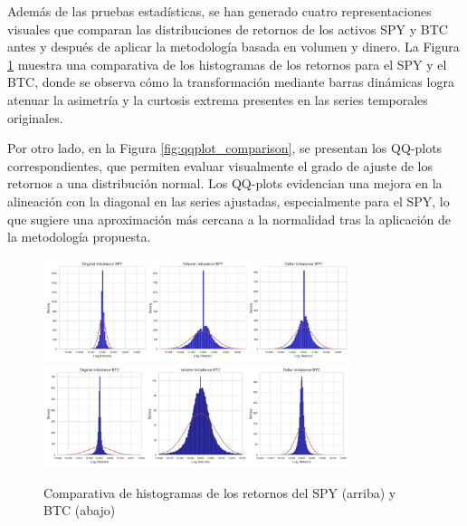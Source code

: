 \documentclass[a4paper,12pt, twoside]{report}
\begin{document}
Además de las pruebas estadísticas, se han generado cuatro representaciones visuales que comparan 
las distribuciones de retornos de los activos SPY y BTC antes y después de aplicar la metodología 
basada en volumen y dinero. La Figura \ref{fig:histogram_comparison} muestra una comparativa de 
los histogramas de los retornos para el SPY y el BTC, donde se observa cómo la transformación 
mediante barras dinámicas logra atenuar la asimetría y la curtosis extrema presentes en las series 
temporales originales. 

Por otro lado, en la Figura \ref{fig:qqplot_comparison}, se presentan los QQ-plots correspondientes, 
que permiten evaluar visualmente el grado de ajuste de los retornos a una distribución normal. 
Los QQ-plots evidencian una mejora en la alineación con la diagonal en las series ajustadas, 
especialmente para el SPY, lo que sugiere una aproximación más cercana a la normalidad tras la 
aplicación de la metodología propuesta. 

\begin{figure}[H]
    \centering
    \includegraphics[width=0.8\textwidth]{figures/SPY_histogram_comparation.png}
    \includegraphics[width=0.8\textwidth]{figures/BTC_histogram_comparation.png}
    \caption{Comparativa de histogramas de los retornos del SPY (arriba) y BTC (abajo)}
    \label{fig:histogram_comparison}
\end{figure}
\end{document}
